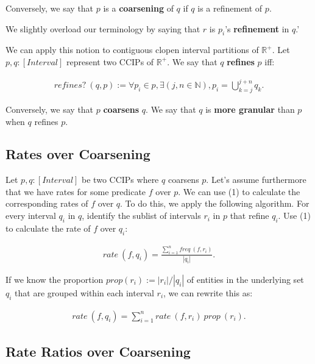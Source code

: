 \documentclass[]{article}
\begin{document}
Conversely, we say that \(p\) is a \textbf{coarsening} of \(q\) if \(q\)
is a refinement of \(p\).

We slightly overload our terminology by saying that \(r\) is \(p_i\)'s
\textbf{refinement} in \(q\).'

We can apply this notion to contiguous clopen interval partitions of
\(\mathbb{R}^+\). Let \(p, q : [Interval]\) represent two CCIPs of
\(\mathbb{R}^+\). We say that \(q\) \textbf{refines} \(p\) iff:

\begin{align*}
refines?\ (q, p) := \forall p_i \in p, \exists (j, n \in \mathbb{N}), p_i = \bigcup_{k=j}^{j+n} q_k.
\end{align*}

Conversely, we say that \(p\) \textbf{coarsens} \(q\). We say that \(q\)
is \textbf{more granular} than \(p\) when \(q\) refines \(p\).

\hypertarget{rates-over-coarsening}{%
\subsection{Rates over Coarsening}\label{rates-over-coarsening}}

Let \(p, q : [Interval]\) be two CCIPs where \(q\) coarsens \(p\). Let's
assume furthermore that we have rates for some predicate \(f\) over
\(p\). We can use (1) to calculate the corresponding rates of \(f\) over
\(q\). To do this, we apply the following algorithm. For every interval
\(q_i\) in \(q\), identify the sublist of intervals \(r_i\) in \(p\)
that refine \(q_i\). Use (1) to calculate the rate of \(f\) over
\(q_i\):

\begin{align*}
  rate\ (f, q_i) = \frac{\sum_{i=1}^n freq\ (f, r_i)}{|q_i|}.
\end{align*}

If we know the proportion \(prop (r_i) := |r_i|/|q_i|\) of entities in
the underlying set \(q_i\) that are grouped within each interval
\(r_i\), we can rewrite this as:

\begin{align*}
rate\ (f, q_i) = \sum_{i = 1}^n rate\ (f, r_i)\ prop\ (r_i).
\end{align*}

\hypertarget{rate-ratios-over-coarsening}{%
\subsection{Rate Ratios over
Coarsening}\label{rate-ratios-over-coarsening}}
\end{document}
